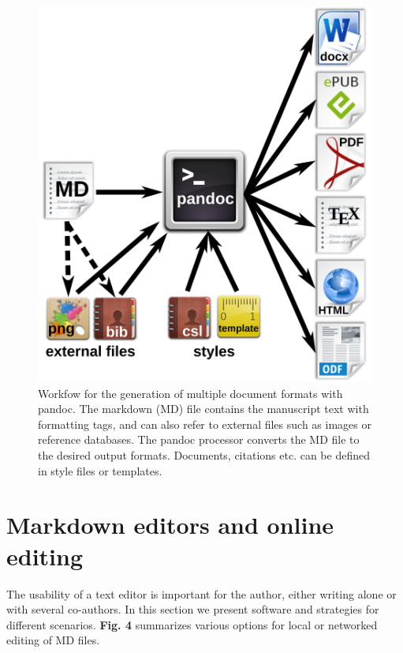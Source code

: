 \documentclass[10pt,fleqn]{wlpeerj}
\begin{document}
\begin{figure}[htbp]
\centering
\includegraphics{fig-pandoc-workflow_small.png}
\caption{Workfow for the generation of multiple document formats with
pandoc. The markdown (MD) file contains the manuscript text with
formatting tags, and can also refer to external files such as images or
reference databases. The pandoc processor converts the MD file to the
desired output formats. Documents, citations etc. can be defined in
style files or templates.}
\end{figure}

\section{Markdown editors and online
editing}\label{markdown-editors-and-online-editing}

The usability of a text editor is important for the author, either
writing alone or with several co-authors. In this section we present
software and strategies for different scenarios. \textbf{Fig. 4}
summarizes various options for local or networked editing of MD files.
\end{document}
